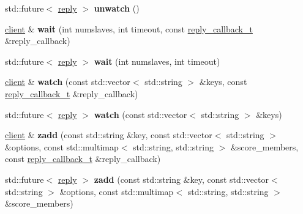 \begin{DoxyCompactItemize}
std\+::future$<$ \hyperlink{classcpp__redis_1_1reply}{reply} $>$ {\bfseries unwatch} ()
\item 
\mbox{\label{classcpp__redis_1_1client_ab7e11ccc1fb07ae3dce860042b96f4d9}} 
\hyperlink{classcpp__redis_1_1client}{client} \& {\bfseries wait} (int numslaves, int timeout, const \hyperlink{classcpp__redis_1_1client_a061a1140d36d2eaeda82b09a0bb3f9f2}{reply\+\_\+callback\+\_\+t} \&reply\+\_\+callback)
\item 
\mbox{\label{classcpp__redis_1_1client_a4ef6f516a3dcdea1b317bb4e5e96e680}} 
std\+::future$<$ \hyperlink{classcpp__redis_1_1reply}{reply} $>$ {\bfseries wait} (int numslaves, int timeout)
\item 
\mbox{\label{classcpp__redis_1_1client_a7faae4f59e4b7f5b5003dcfbbf04af89}} 
\hyperlink{classcpp__redis_1_1client}{client} \& {\bfseries watch} (const std\+::vector$<$ std\+::string $>$ \&keys, const \hyperlink{classcpp__redis_1_1client_a061a1140d36d2eaeda82b09a0bb3f9f2}{reply\+\_\+callback\+\_\+t} \&reply\+\_\+callback)
\item 
\mbox{\label{classcpp__redis_1_1client_a437606353878a903033ced5cb56ed07c}} 
std\+::future$<$ \hyperlink{classcpp__redis_1_1reply}{reply} $>$ {\bfseries watch} (const std\+::vector$<$ std\+::string $>$ \&keys)
\item 
\mbox{\label{classcpp__redis_1_1client_a3440c0427f9e49c261fed178b7c1a943}} 
\hyperlink{classcpp__redis_1_1client}{client} \& {\bfseries zadd} (const std\+::string \&key, const std\+::vector$<$ std\+::string $>$ \&options, const std\+::multimap$<$ std\+::string, std\+::string $>$ \&score\+\_\+members, const \hyperlink{classcpp__redis_1_1client_a061a1140d36d2eaeda82b09a0bb3f9f2}{reply\+\_\+callback\+\_\+t} \&reply\+\_\+callback)
\item 
\mbox{\label{classcpp__redis_1_1client_aa2df92b86ac0d55740fbe3548ed79443}} 
std\+::future$<$ \hyperlink{classcpp__redis_1_1reply}{reply} $>$ {\bfseries zadd} (const std\+::string \&key, const std\+::vector$<$ std\+::string $>$ \&options, const std\+::multimap$<$ std\+::string, std\+::string $>$ \&score\+\_\+members)
\item 

\end{DoxyCompactItemize}
